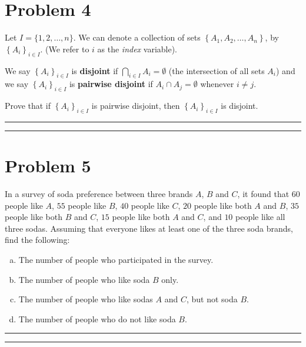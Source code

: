 \documentclass{article}
\theoremstyle{definition}
\newenvironment{solution}{\bigskip\hrule{\hfill}}{\bigskip\hrule{\hfill}} %
\begin{document}
\newpage


\section*{Problem 4}
Let $I=\{1,2,\dots,n\}$. We can denote a collection of sets $\left\{A_1,A_2,\dots,A_n\right\}$, by $\left\{A_i\right\}_{i\in I}$. (We refer to $i$ as the \emph{index} variable). \medskip

\noindent We say $\left\{A_i\right\}_{i\in I}$ is \textbf{disjoint} if $\displaystyle\bigcap_{i\in I}A_i=\emptyset$ (the intersection of all sets $A_i$) and we say $\left\{A_i\right\}_{i\in I}$ is \textbf{pairwise disjoint} if $A_i\cap A_j=\emptyset$ whenever $i\neq j$. \medskip

\noindent Prove that if $\left\{A_i\right\}_{i\in I}$ is pairwise disjoint, then $\left\{A_i\right\}_{i\in I}$ is disjoint.
\begin{solution}


\end{solution}


\newpage


\section*{Problem 5}
In a survey of soda preference between three brands $A$, $B$ and $C$, it found that $60$ people like $A$, $55$ people like $B$, $40$ people like $C$, $20$ people like both $A$ and $B$, $35$ people like both $B$ and $C$, $15$ people like both $A$ and $C$, and $10$ people like all three sodas. Assuming that everyone likes at least one of the three soda brands, find the following:
\begin{enumerate}[a)] %
    \item The number of people who participated in the survey.
    \item The number of people who like soda $B$ only.
    \item The number of people who like sodas $A$ and $C$, but not soda $B$.
    \item The number of people who do not like soda $B$.
\end{enumerate}
\begin{solution}


\end{solution}
\end{document}
